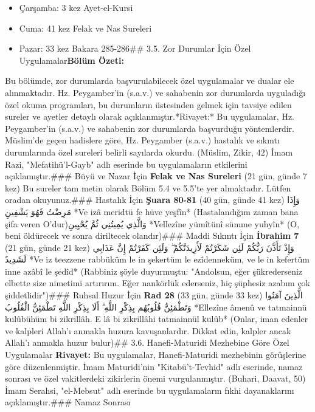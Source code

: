 \documentclass[12pt,a4paper]{article}
\begin{document}
\begin{itemize}
\item Çarşamba: 3 kez Ayet-el-Kursi
\item Cuma: 41 kez Felak ve Nas Sureleri
\item Pazar: 33 kez Bakara 285-286\#\# 3.5. Zor Durumlar İçin Özel Uygulamalar\textbf{Bölüm Özeti:}
\end{itemize}
Bu bölümde, zor durumlarda başvurulabilecek özel uygulamalar ve dualar ele alınmaktadır. Hz. Peygamber'in (s.a.v.) ve sahabenin zor durumlarda uyguladığı özel okuma programları, bu durumların üstesinden gelmek için tavsiye edilen sureler ve ayetler detaylı olarak açıklanmıştır.*Rivayet:* Bu uygulamalar, Hz. Peygamber'in (s.a.v.) ve sahabenin zor durumlarda başvurduğu yöntemlerdir. Müslim'de geçen hadislere göre, Hz. Peygamber (s.a.v.) hastalık ve sıkıntı durumlarında özel sureleri belirli sayılarda okurdu. (Müslim, Zikir, 42) İmam Razi, "Mefatihü'l-Gayb" adlı eserinde bu uygulamaların etkilerini açıklamıştır.\#\#\# Büyü ve Nazar İçin
\textbf{Felak ve Nas Sureleri} (21 gün, günde 7 kez)
Bu sureler tam metin olarak Bölüm 5.4 ve 5.5'te yer almaktadır. Lütfen oradan okuyunuz.\#\#\# Hastalık İçin
\textbf{Şuara 80-81} (40 gün, günde 41 kez)
وَإِذَا مَرِضْتُ فَهُوَ يَشْفِينِ
*Ve izâ meridtü fe hüve yeşfîn*
(Hastalandığım zaman bana şifa veren O'dur)وَالَّذِي يُمِيتُنِي ثُمَّ يُحْيِينِ
*Vellezîne yümîtünî sümme yuhyîn*
(O, beni öldürecek ve sonra diriltecek olandır)\#\#\# Maddi Sıkıntı İçin
\textbf{İbrahim 7} (21 gün, günde 21 kez)
وَإِذْ تَأَذَّنَ رَبُّكُمْ لَئِن شَكَرْتُمْ لَأَزِيدَنَّكُمْ ۖ وَلَئِن كَفَرْتُمْ إِنَّ عَذَابِي لَشَدِيدٌ
*Ve iz teezzene rabbüküm le in şekertüm le ezîdenneküm, ve le in kefertüm inne azâbî le şedîd*
(Rabbiniz şöyle duyurmuştu: "Andolsun, eğer şükrederseniz elbette size nimetimi artırırım. Eğer nankörlük ederseniz, hiç şüphesiz azabım çok şiddetlidir")\#\#\# Ruhsal Huzur İçin
\textbf{Rad 28} (33 gün, günde 33 kez)
الَّذِينَ آمَنُوا وَتَطْمَئِنُّ قُلُوبُهُم بِذِكْرِ اللَّهِ ۗ أَلَا بِذِكْرِ اللَّهِ تَطْمَئِنُّ الْقُلُوبُ
*Ellezîne âmenû ve tatmainnü kulûbühüm bi zikrillâh. E lâ bi zikrillâhi tatmainnül kulûb*
(Onlar, iman edenler ve kalpleri Allah'ı anmakla huzura kavuşanlardır. Dikkat edin, kalpler ancak Allah'ı anmakla huzur bulur)\#\# 3.6. Hanefi-Maturidi Mezhebine Göre Özel Uygulamalar
\textbf{Rivayet:} Bu uygulamalar, Hanefi-Maturidi mezhebinin görüşlerine göre düzenlenmiştir. İmam Maturidi'nin "Kitabü't-Tevhid" adlı eserinde, namaz sonrası ve özel vakitlerdeki zikirlerin önemi vurgulanmıştır. (Buhari, Daavat, 50) İmam Serahsi, "el-Mebsut" adlı eserinde bu uygulamaların fıkhi dayanaklarını açıklamıştır.\#\#\# Namaz Sonrası
\end{document}
